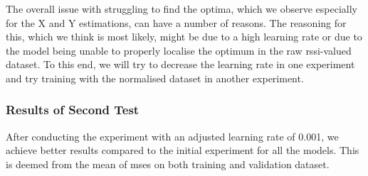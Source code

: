 The overall issue with struggling to find the optima, which we observe especially for the X and Y estimations, can have a number of reasons. The reasoning for this, which we think is most likely, might be due to a high learning rate or due to the model being unable to properly localise the optimum in the raw \gls{rssi}-valued dataset. To this end, we will try to decrease the learning rate in one experiment and try training with the normalised dataset in another experiment.


\subsubsection{Results of Second Test}
After conducting the experiment with an adjusted learning rate of 0.001, we achieve better results compared to the initial experiment for all the models. This is deemed from the mean of \gls{mse}s on both training and validation dataset. 

